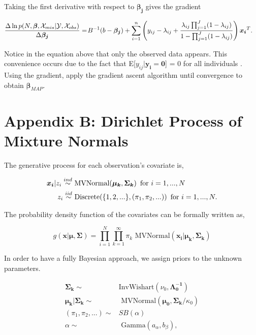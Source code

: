 \documentclass[
  12pt,
]{article}
\begin{document}
Taking the first derivative with respect to \(\boldsymbol{\beta_j}\)
gives the gradient

\begin{align}
\frac{\Delta \ln p(N,\boldsymbol{\beta},\mathcal{X}_{mis}|\mathcal{Y},\mathcal{X}_{obs})}{\Delta \boldsymbol{\beta_j}} = & \hspace{1px} B^{-1}(b-\boldsymbol{\beta_j}) + \sum_{i=1}^n \left(y_{ij}-\lambda_{ij}+\frac{\lambda_{ij}\prod_{j=1}^J(1-\lambda_{ij})}{1-\prod_{j=1}^J(1-\lambda_{ij})} \right)\boldsymbol{x_i}^T.
\end{align}

Notice in the equation above that only the observed data appears. This
convenience occurs due to the fact that
E{[}\(y_{ij}|\boldsymbol{y_i}= \boldsymbol{0}\){]} = 0 for all
individuals \citep{alho_logistic_1990}. Using the gradient, apply the
gradient ascent algorithm until convergence to obtain
\(\boldsymbol{\beta}_{MAP}\).

\section{Appendix B: Dirichlet Process of Mixture Normals}
\label{DPnormalmix}

The generative process for each observation's covariate is,

\begin{align}
\boldsymbol{x_i}|z_i \stackrel{ind}{\sim} & \text{ MVNormal}(\boldsymbol{\mu_k},\boldsymbol{\Sigma_k}) \hspace{5px} \text{for } i=1,...,N\\
z_i \stackrel{iid}{\sim} & \text{ Discrete}(\{1,2,...\},(\pi_1,\pi_2,...)) \hspace{5px} \text{for } i=1,...,N.
\end{align}

The probability density function of the covariates can be formally
written as,

\begin{equation}
g(\boldsymbol{x}|\boldsymbol{\mu},\boldsymbol{\Sigma}) = \prod_{i=1}^N \prod_{k=1}^\infty \pi_k \text{ MVNormal}(\boldsymbol{x_i}|\boldsymbol{\mu_k},\boldsymbol{\Sigma_k})
\end{equation}

In order to have a fully Bayesian approach, we assign priors to the
unknown parameters.

\begin{align}
\boldsymbol{\Sigma_k} \sim & \text{InvWishart}(\nu_{0},\boldsymbol{\Lambda_{0}^{-1}}) \\
\boldsymbol{\mu_k}|\boldsymbol{\Sigma_k} \sim & \text{ MVNormal}(\boldsymbol{\mu_{0}},\boldsymbol{\Sigma_k}/\kappa_{0}) \\
(\pi_1,\pi_2,...) \sim & SB(\alpha) \\
\alpha \sim & \text{ Gamma}(a_{\alpha},b_{\beta}),
\end{align}
\end{document}
